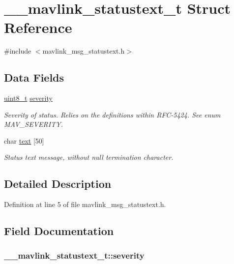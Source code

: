 \hypertarget{struct____mavlink__statustext__t}{\section{\-\_\-\-\_\-mavlink\-\_\-statustext\-\_\-t Struct Reference}
\label{struct____mavlink__statustext__t}
}


{\ttfamily \#include $<$mavlink\-\_\-msg\-\_\-statustext.\-h$>$}

\subsection*{Data Fields}
\begin{DoxyCompactItemize}
\item 
\hyperlink{stdint_8h_aba7bc1797add20fe3efdf37ced1182c5}{uint8\-\_\-t} \hyperlink{struct____mavlink__statustext__t_a3078f8993a445c45f44e2f3127c38291}{severity}
\begin{DoxyCompactList}\small\item\em Severity of status. Relies on the definitions within R\-F\-C-\/5424. See enum M\-A\-V\-\_\-\-S\-E\-V\-E\-R\-I\-T\-Y. \end{DoxyCompactList}\item 
char \hyperlink{struct____mavlink__statustext__t_ad841b35268fabb3a101c2524da5a31be}{text} \mbox{[}50\mbox{]}
\begin{DoxyCompactList}\small\item\em Status text message, without null termination character. \end{DoxyCompactList}\end{DoxyCompactItemize}


\subsection{Detailed Description}


Definition at line 5 of file mavlink\-\_\-msg\-\_\-statustext.\-h.



\subsection{Field Documentation}
\hypertarget{struct____mavlink__statustext__t_a3078f8993a445c45f44e2f3127c38291}{
\subsubsection[{severity}]{ \-\_\-\-\_\-mavlink\-\_\-statustext\-\_\-t\-::severity}}\label{struct____mavlink__statustext__t_a3078f8993a445c45f44e2f3127c38291}


